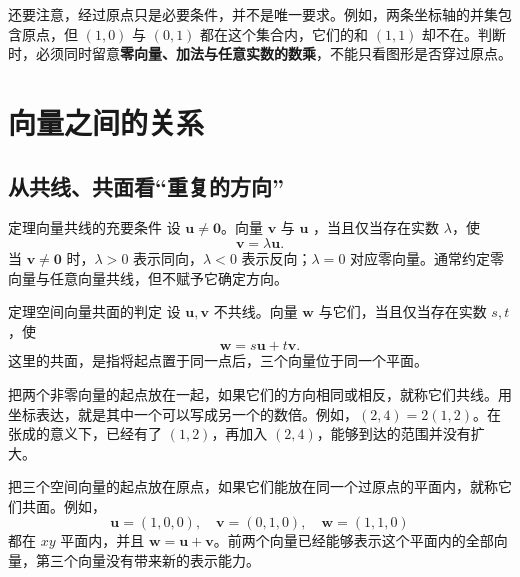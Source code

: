 \documentclass[a4paper,12pt,twoside,openany,fontset=none]{ctexbook}
\newcounter{theorem}[chapter]
\newenvironment{theorem}[1][]{\begin{thmBox}{定理}{#1}}{\end{thmBox}}
\numberwithin{equation}{chapter}
\begin{document}
还要注意，经过原点只是必要条件，并不是唯一要求。例如，两条坐标轴的并集包含原点，但 $(1,0)$ 与 $(0,1)$ 都在这个集合内，它们的和 $(1,1)$ 却不在。判断时，必须同时留意\textbf{零向量、加法与任意实数的数乘}，不能只看图形是否穿过原点。

\section{向量之间的关系}
\label{sec:zero-dependence}

\subsection*{从共线、共面看“重复的方向”}

\begin{theorem}[向量共线的充要条件]
设 $\boldsymbol{u}\ne\boldsymbol{0}$。向量 $\boldsymbol{v}$ 与 $\boldsymbol{u}$ ，当且仅当存在实数 $\lambda$，使
\[
    \boldsymbol{v}=\lambda\boldsymbol{u}.
\]
当 $\boldsymbol{v}\ne\boldsymbol{0}$ 时，$\lambda>0$ 表示同向，$\lambda<0$ 表示反向；$\lambda=0$ 对应零向量。通常约定零向量与任意向量共线，但不赋予它确定方向。
\end{theorem}

\begin{theorem}[空间向量共面的判定]
设 $\boldsymbol{u},\boldsymbol{v}$ 不共线。向量 $\boldsymbol{w}$ 与它们，当且仅当存在实数 $s,t$，使
\[
    \boldsymbol{w}=s\boldsymbol{u}+t\boldsymbol{v}.
\]
这里的共面，是指将起点置于同一点后，三个向量位于同一个平面。
\end{theorem}


把两个非零向量的起点放在一起，如果它们的方向相同或相反，就称它们共线。用坐标表达，就是其中一个可以写成另一个的数倍。例如，$(2,4)=2(1,2)$。在张成的意义下，已经有了 $(1,2)$，再加入 $(2,4)$，能够到达的范围并没有扩大。

把三个空间向量的起点放在原点，如果它们能放在同一个过原点的平面内，就称它们共面。例如，
\[
    \boldsymbol{u}=(1,0,0),\quad
    \boldsymbol{v}=(0,1,0),\quad
    \boldsymbol{w}=(1,1,0)
\]
都在 $xy$ 平面内，并且 $\boldsymbol{w}=\boldsymbol{u}+\boldsymbol{v}$。前两个向量已经能够表示这个平面内的全部向量，第三个向量没有带来新的表示能力。
\end{document}
